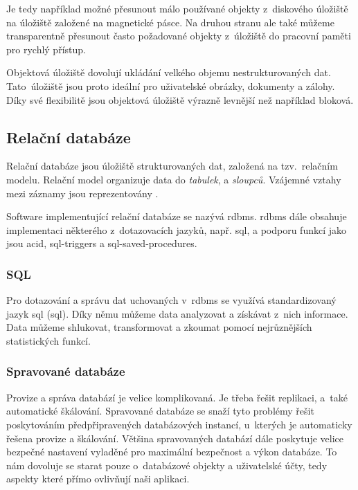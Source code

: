 Je tedy například možné přesunout málo používané objekty z~diskového úložiště na úložiště založené na magnetické pásce. Na druhou stranu ale také můžeme transparentně přesunout často požadované objekty z~úložiště do pracovní paměti pro rychlý přístup.

Objektová úložiště dovolují ukládání velkého objemu nestrukturovaných dat.
Tato úložiště jsou proto ideální pro uživatelské obrázky, dokumenty a zálohy.
Díky své flexibilitě jsou objektová úložiště výrazně levnější než například bloková.

\subsection{Relační databáze}

Relační databáze\cite{relational-database} jsou úložiště strukturovaných dat, založená na tzv.\ relačním modelu. Relační model organizuje data do \emph{tabulek},  a \emph{sloupců}. Vzájemné vztahy mezi záznamy jsou reprezentovány . 

Software implementující relační databáze se nazývá \acrfull{rdbms}. \acrshort{rdbms} dále obsahuje implementaci některého z~dotazovacích jazyků, např. \acrshort{sql}, a podporu funkcí jako jsou \acrshort{acid}, \glspl{sql-trigger} a \glspl{sql-saved-procedure}.

\subsubsection{SQL}

Pro dotazování a správu dat uchovaných v~\acrshort{rdbms} se využívá standardizovaný jazyk \acrshort{sql} (\acrlong{sql})\cite{sql}. Díky němu můžeme data analyzovat a získávat z~nich informace. Data můžeme shlukovat, transformovat a zkoumat pomocí nejrůznějších statistických funkcí.

\subsubsection{Spravované databáze}\label{subsub:managed-databases}

Provize a správa databází je velice komplikovaná. Je třeba řešit replikaci, a~také automatické škálování. Spravované databáze\cite{managed-databases} se snaží tyto problémy řešit poskytováním předpřipravených databázových instancí, u~kterých je automaticky řešena provize a škálování. Většina spravovaných databází dále poskytuje velice bezpečné nastavení vyladěné pro maximální bezpečnost a výkon databáze. To nám dovoluje se starat pouze o~databázové objekty a uživatelské účty, tedy aspekty které přímo ovlivňují naši aplikaci.

